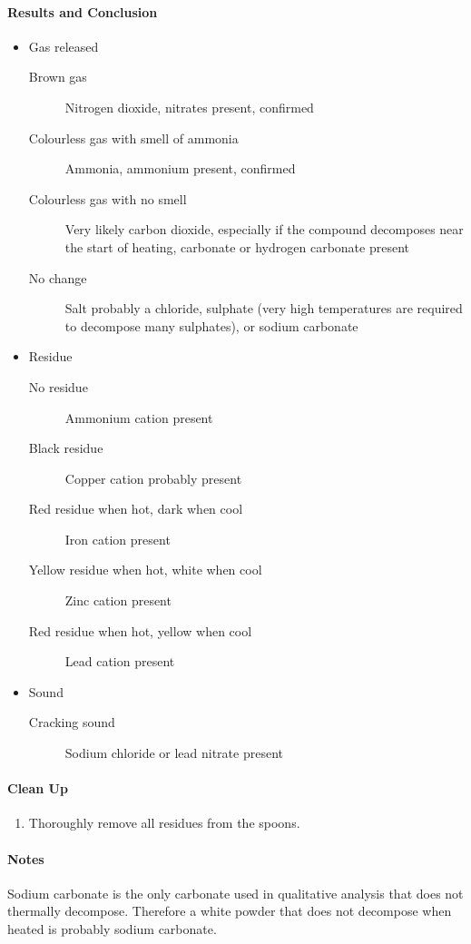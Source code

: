 \paragraph{Results and Conclusion}
\begin{itemize}
\item{Gas released}
\begin{description}
\item[Brown gas]{Nitrogen dioxide, nitrates present, confirmed}
\item[Colourless gas with smell of ammonia]{Ammonia, ammonium present, confirmed}
\item[Colourless gas with no smell]{Very likely carbon dioxide, especially if the compound decomposes near the start of heating, carbonate or hydrogen carbonate present}
\item[No change]{Salt probably a chloride, sulphate (very high temperatures are required to decompose many sulphates), or sodium carbonate}
\end{description}
\item{Residue}
\begin{description}
\item[No residue]{Ammonium cation present}
\item[Black residue]{Copper cation probably present}
\item[Red residue when hot, dark when cool]{Iron cation present}
\item[Yellow residue when hot, white when cool]{Zinc cation present}
\item[Red residue when hot, yellow when cool]{Lead cation present}
\end{description}
\item{Sound}
\begin{description}
\item[Cracking sound]{Sodium chloride or lead nitrate present}
\end{description}
\end{itemize}

\paragraph{Clean Up}
\begin{enumerate}
\item{Thoroughly remove all residues from the spoons.}
\end{enumerate}

\paragraph{Notes}
Sodium carbonate is the only carbonate used in qualitative analysis that does not thermally decompose. Therefore a white powder that does not decompose when heated is probably sodium carbonate.

